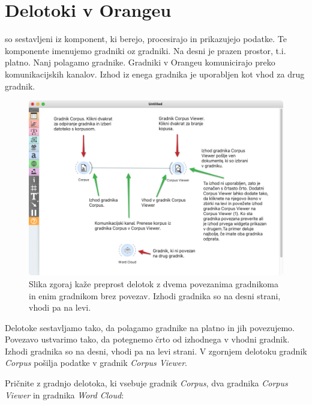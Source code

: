 \chapter{Delotoki v Orangeu}
\label{ch:workflows}

 so sestavljeni iz komponent, ki berejo, procesirajo in prikazujejo podatke. Te komponente imenujemo gradniki oz gradniki. Na desni je prazen prostor, t.i. platno. Nanj polagamo gradnike. Gradniki v Orangeu komunicirajo preko komunikacijskih kanalov. Izhod iz enega gradnika je uporabljen kot vhod za drug gradnik.

\begin{figure}[h]
  \includegraphics[width=\linewidth]{workflow-fig1.png}%
  \caption{Slika zgoraj kaže preprost delotok z dvema povezanima gradnikoma in enim gradnikom brez povezav. Izhodi gradnika so na desni strani, vhodi pa na levi.}
  \label{fig:workflow-fig1}
\end{figure}

Delotoke sestavljamo tako, da polagamo gradnike na platno in jih povezujemo. Povezavo ustvarimo tako, da potegnemo črto od izhodnega v vhodni gradnik. Izhodi gradnika so na desni, vhodi pa na levi strani. V zgornjem delotoku gradnik \textit{Corpus} pošilja podatke v gradnik \textit{Corpus Viewer}.

\newpage

Pričnite z gradnjo delotoka, ki vsebuje gradnik \textit{Corpus}, dva gradnika \textit{Corpus Viewer} in gradnika \textit{Word Cloud}:

